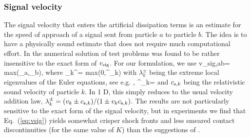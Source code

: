\documentclass{elsart}
\begin{document}
\subsubsection{Signal velocity}
The signal velocity that enters the artificial dissipation terms is an
estimate for the speed of approach of a signal sent from particle $a$ 
to particle $b$. The idea is to have a physically sound estimate that does 
not require much computational effort. In \cite{monaghan97,chow97} the numerical
solution of test problems was found to be rather insensitive to the exact 
form of $v_{\rm sig}$. For our formulation, we use 
\be
v_{\rm sig,ab}= {\rm max}(\alpha_a,\alpha_b),\label{eq:vsig}
\ee
where
\be
\alpha_k^{\pm}= {\rm max}(0,\pm \lambda^\pm_k)
\ee
with $\lambda^\pm_k$ being the extreme local eigenvalues of the Euler equations, see e.g. \cite{marti03},
\be
\lambda^\pm_k= 
\ee
and $c_{{\rm s},k}$ being the relativistic sound velocity of particle $k$. In 1 D, this simply reduces
to the usual velocity addition law, $\lambda^\pm_k= (v_k\pm c_{{\rm s},k})/(1\pm v_k c_{{\rm s},k}) $.
The results are not particularly sensitive to the exact form of the signal velocity, but
in experiments we find that
Eq.~(\ref{eq:vsig}) yields somewhat crisper shock fronts and less smeared contact 
discontinuities (for the same value of $K$) than the suggestions of \cite{chow97}.
\end{document}
